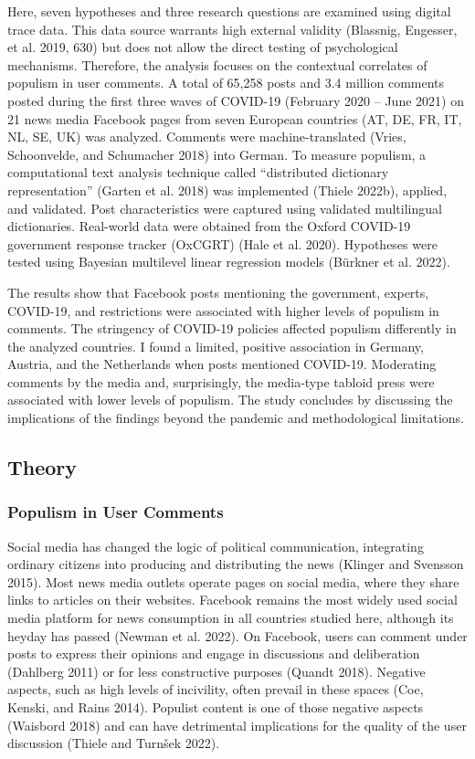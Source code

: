 \documentclass[
]{ccr}
\begin{document}
Here, seven hypotheses and three research questions are examined using
digital trace data. This data source warrants high external validity
(Blassnig, Engesser, et al. 2019, 630) but does not allow the direct
testing of psychological mechanisms. Therefore, the analysis focuses on
the contextual correlates of populism in user comments. A total of
65,258 posts and 3.4 million comments posted during the first three
waves of COVID-19 (February 2020 -- June 2021) on 21 news media Facebook
pages from seven European countries (AT, DE, FR, IT, NL, SE, UK) was
analyzed. Comments were machine-translated (Vries, Schoonvelde, and
Schumacher 2018) into German. To measure populism, a computational text
analysis technique called ``distributed dictionary representation''
(Garten et al. 2018) was implemented (Thiele 2022b), applied, and
validated. Post characteristics were captured using validated
multilingual dictionaries. Real-world data were obtained from the Oxford
COVID-19 government response tracker (OxCGRT) (Hale et al. 2020).
Hypotheses were tested using Bayesian multilevel linear regression
models (Bürkner et al. 2022).

The results show that Facebook posts mentioning the government, experts,
COVID-19, and restrictions were associated with higher levels of
populism in comments. The stringency of COVID-19 policies affected
populism differently in the analyzed countries. I found a limited,
positive association in Germany, Austria, and the Netherlands when posts
mentioned COVID-19. Moderating comments by the media and, surprisingly,
the media-type tabloid press were associated with lower levels of
populism. The study concludes by discussing the implications of the
findings beyond the pandemic and methodological limitations.

\hypertarget{theory}{%
\subsection{Theory}\label{theory}}

\hypertarget{populism-in-user-comments}{%
\subsubsection{Populism in User
Comments}\label{populism-in-user-comments}}

Social media has changed the logic of political communication,
integrating ordinary citizens into producing and distributing the news
(Klinger and Svensson 2015). Most news media outlets operate pages on
social media, where they share links to articles on their websites.
Facebook remains the most widely used social media platform for news
consumption in all countries studied here, although its heyday has
passed (Newman et al. 2022). On Facebook, users can comment under posts
to express their opinions and engage in discussions and deliberation
(Dahlberg 2011) or for less constructive purposes (Quandt 2018).
Negative aspects, such as high levels of incivility, often prevail in
these spaces (Coe, Kenski, and Rains 2014). Populist content is one of
those negative aspects (Waisbord 2018) and can have detrimental
implications for the quality of the user discussion (Thiele and Turnšek
2022).
\end{document}
